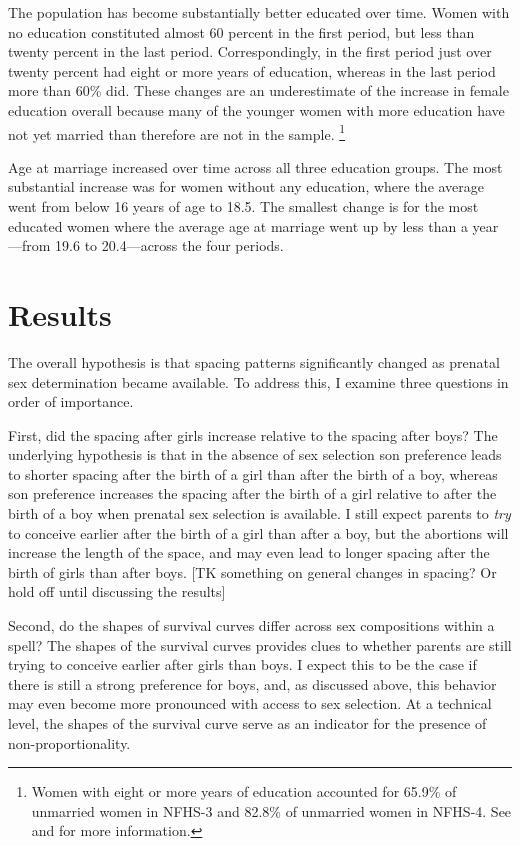 \documentclass[12pt,letterpaper]{article}
\begin{document}
The population has become substantially better educated over time.
Women with no education constituted almost 60 percent 
in the first period, but less than twenty percent in the last period.
Correspondingly, in the first period just over twenty percent had eight or more 
years of education, whereas in the last period more than 60\% did.
These changes are an underestimate of the increase in female
education overall because many of the younger women with more education
have not yet married than therefore are not in the sample.%
\footnote{
Women with eight or more years of education accounted for 65.9\% of
unmarried women in NFHS-3 and 82.8\% of unmarried women in NFHS-4.
See \citet[p 56]{International-Institute-for-Population-Sciences-IIPS2007}
and \citet[p 61]{International-Institute-for-Population-Sciences-IIPS2017}
for more information.
 }

Age at marriage increased over time across all three education groups.
The most substantial increase was for women without any education, where
the average went from below 16 years of age to 18.5.
The smallest change is for the most educated women where the average age
at marriage went up by less than a year---from 19.6 to 20.4---across the 
four periods.


\section{Results\label{sec:results}}


The overall hypothesis is that spacing patterns significantly changed 
as prenatal sex determination became available.
To address this, I examine three questions in order of importance.

First, did the spacing after girls increase relative to the spacing
after boys?
The underlying hypothesis is that in the absence of sex selection son 
preference leads to shorter spacing after the birth of a girl than after the 
birth of a boy, whereas son preference increases the spacing after the birth 
of a girl relative to after the birth of a boy when prenatal sex selection is 
available.
I still expect parents to \emph{try} to conceive earlier after the birth 
of a girl than after a boy, but the abortions will increase the 
length of the space, and may even lead to longer spacing after the
birth of girls than after boys.
[TK something on general changes in spacing? Or hold off until discussing the
results]

Second, do the shapes of survival curves differ across sex compositions 
within a spell?
The shapes of the survival curves provides clues to whether parents are
still trying to conceive earlier after girls than boys.
I expect this to be the case if there is still a strong preference for
boys, and, as discussed above, this behavior may even become more pronounced
with access to sex selection.
At a technical level, the shapes of the survival curve serve as an
indicator for the presence of non-proportionality.
\end{document}
